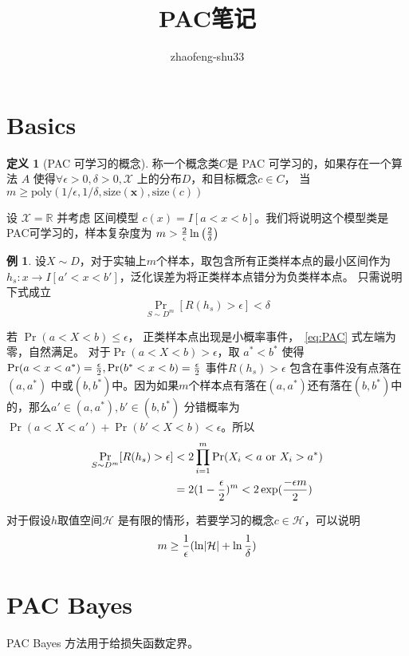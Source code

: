 \documentclass{article}
\theoremstyle{definition}
\newtheorem{definition}{定义}
\newtheorem{example}{例}
\DeclarePairedDelimiter\abs{\lvert}{\rvert}
\begin{document}
\title{PAC笔记}
\author{zhaofeng-shu33}
\maketitle
\section{Basics}
\begin{definition}[PAC 可学习的概念]
称一个概念类$C$是 PAC 可学习的，如果存在一个算法 $A$ 使得$\forall \epsilon>0, \delta>0, \mathcal{X}$ 上的分布$D$，和目标概念$c \in C$， 当$ m \geq \textrm{poly}(1/\epsilon, 1/\delta, \textrm{size}(\bm{x}), \textrm{size}(c))$
\end{definition}
设 $ \mathcal{X} = \mathbb{R}$ 并考虑 区间模型 $ c(x) = I[a<x<b]$。我们将说明这个模型类是 PAC可学习的，样本复杂度为
$ m > {2 \over \epsilon} \ln\left({2 \over \delta} \right) $
\begin{example}
设$X \sim D$，对于实轴上$m$个样本，取包含所有正类样本点的最小区间作为$h_s: x \to I[a' < x < b']$，泛化误差为将正类样本点错分为负类样本点。
只需说明下式成立
\begin{equation}\label{eq:PAC}
\Pr_{S \sim D^m} [ R(h_s) > \epsilon ] < \delta
\end{equation}

若 $\Pr(a < X < b) \leq \epsilon $， 正类样本点出现是小概率事件，~\eqref{eq:PAC} 式左端为零，自然满足。
对于$\Pr(a < X < b) > \epsilon $，取 $ a^* < b^* $ 使得 $\Pr(a<x<a^*) = {\epsilon \over 2}, \Pr( b^*<x< b) = {\epsilon \over 2}$
事件$R(h_s) > \epsilon$ 包含在事件没有点落在$(a,a^*)$ 中或$(b,b^*)$中。因为如果$m$个样本点有落在$(a,a^*)$还有落在$(b,b^*)$中的，那么$a'\in (a,a^*), b'\in (b,b^*)$ 分错概率为$\Pr(a<X<a')+\Pr(b'<X<b)<\epsilon $。所以
\begin{align}
\Pr_{S \sim D^m} [ R(h_s) > \epsilon ]  & < 2 \prod_{i=1}^m \Pr(X_i < a \textrm{ or } X_i>a^*) \\
& = 2(1-{\epsilon \over 2})^m < 2 \exp({-\epsilon m \over 2 })
\end{align}
\end{example}

对于假设$h$取值空间$\mathcal{H}$ 是有限的情形，若要学习的概念$c \in \mathcal{H}$，可以说明
\begin{equation}
m \geq {1 \over \epsilon} ( \ln \abs{\mathcal{H}} + \ln{ 1 \over \delta})
\end{equation}
\section{PAC Bayes}
PAC Bayes 方法用于给损失函数定界。
\end{document}
